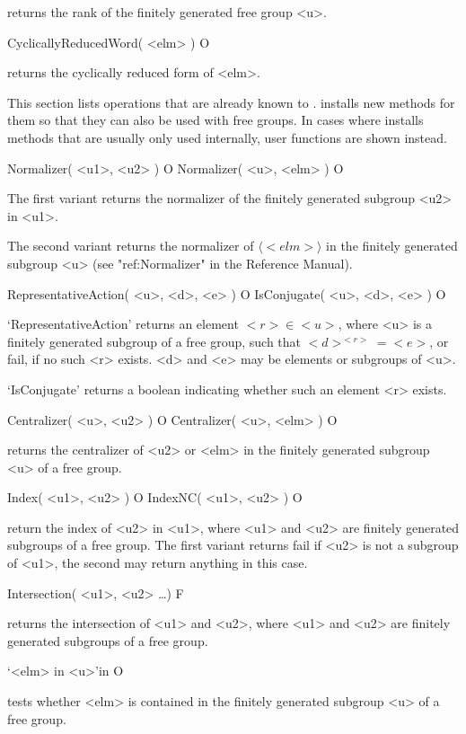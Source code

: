 returns the rank of the finitely generated free group <u>.

\>CyclicallyReducedWord( <elm> ) O

returns the cyclically reduced form of <elm>.


This section lists operations that are already known to {\GAP}.
{\FGA} installs new methods for them so that they can also be used
with free groups.
In cases where {\FGA} installs methods that are usually only used
internally, user functions are shown instead.


\>Normalizer( <u1>, <u2> ) O
\>Normalizer( <u>, <elm> ) O

The first variant returns the normalizer of the finitely generated
subgroup <u2> in <u1>.

The second variant returns the normalizer of $\langle <elm> \rangle$
in the finitely generated subgroup <u> (see "ref:Normalizer" in the
Reference Manual).

\>RepresentativeAction( <u>, <d>, <e> ) O
\>IsConjugate( <u>, <d>, <e> ) O

`RepresentativeAction' returns an element $ <r> \in <u> $,
where <u> is a finitely generated subgroup of a free group, such
that $<d>^{<r>}=<e>$, or fail, if no such <r> exists.  <d> and <e> may
be elements or subgroups of <u>.

`IsConjugate' returns a boolean indicating whether such an element <r>
exists.

\>Centralizer( <u>, <u2> ) O
\>Centralizer( <u>, <elm> ) O

returns the centralizer of <u2> or <elm> in the finitely generated
subgroup <u> of a free group.

\>Index( <u1>, <u2> ) O
\>IndexNC( <u1>, <u2> ) O

return the index of <u2> in <u1>, where <u1> and <u2> are finitely
generated subgroups of a free group.  The first variant returns
fail if <u2> is not a subgroup of <u1>, the second may return
anything in this case.

\>Intersection( <u1>, <u2> \dots ) F

returns the intersection of <u1> and <u2>, where <u1> and <u2> are
finitely generated subgroups of a free group.

\>`<elm> in <u>'{in} O

tests whether <elm> is contained in the finitely generated subgroup
<u> of a free group.

